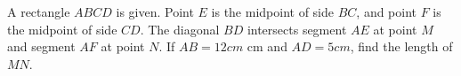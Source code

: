 A rectangle $ABCD$ is given. Point $E$ is the midpoint of side $BC$, and point $F$ is the midpoint of side $CD$. The diagonal $BD$ intersects segment $AE$ at point $M$ and segment $AF$ at point $N$. If $AB=12cm$ cm and $AD=5cm$, find the length of $MN$.
